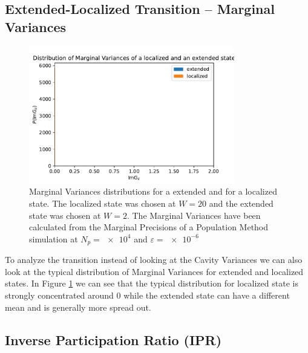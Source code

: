 \documentclass[../main.tex]{subfiles}
\begin{document}
\subsection{Extended-Localized Transition -- Marginal Variances}

\begin{figure}[htpb]
    \centering
    \includegraphics[width=0.8\textwidth]{../figures/ex3_typical_marginal_dists.pdf}
    \caption{
    Marginal Variances distributions for a extended and for a localized state. The localized state was chosen at $W = \num{20}$ and the extended state was chosen at $W = \num{2}$. 
    The Marginal Variances have been calculated from the Marginal Precisions of a Population Method simulation at $N_p = \num{e4}$ and $\varepsilon = \num{e-6}$
}
    \label{fig:marginal_variances_typical}
\end{figure}

To analyze the transition instead of looking at the Cavity Variances we can also look at the typical distribution of Marginal Variances for extended and localized states.
In Figure \ref{fig:marginal_variances_typical} we can see that the typical distribution for localized state is strongly concentrated around $0$ while the extended state can have a different mean and is generally more spread out.


\subsection{Inverse Participation Ratio (IPR)}
\end{document}
